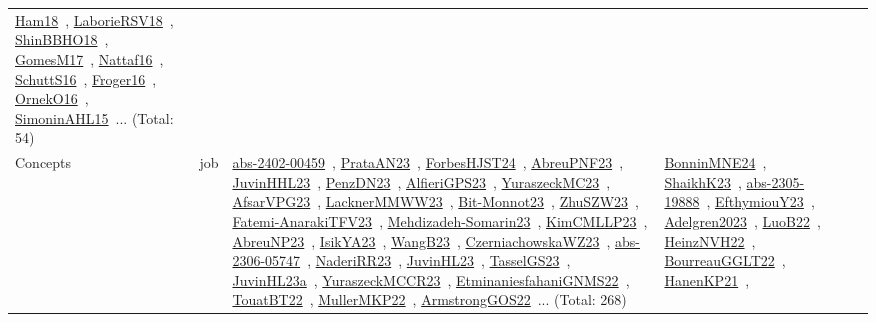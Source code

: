 {\begin{longtable}{lp{3cm}>{\raggedright\arraybackslash}p{6cm}>{\raggedright\arraybackslash}p{6cm}>{\raggedright\arraybackslash}p{8cm}}
\href{../works/Ham18.pdf}{Ham18}~\cite{Ham18}, \href{../works/LaborieRSV18.pdf}{LaborieRSV18}~\cite{LaborieRSV18}, \href{../works/ShinBBHO18.pdf}{ShinBBHO18}~\cite{ShinBBHO18}, \href{../works/GomesM17.pdf}{GomesM17}~\cite{GomesM17}, \href{../works/Nattaf16.pdf}{Nattaf16}~\cite{Nattaf16}, \href{../works/SchuttS16.pdf}{SchuttS16}~\cite{SchuttS16}, \href{../works/Froger16.pdf}{Froger16}~\cite{Froger16}, \href{../works/OrnekO16.pdf}{OrnekO16}~\cite{OrnekO16}, \href{../works/SimoninAHL15.pdf}{SimoninAHL15}~\cite{SimoninAHL15}... (Total: 54)\\
Concepts & job & \href{../works/abs-2402-00459.pdf}{abs-2402-00459}~\cite{abs-2402-00459}, \href{../works/PrataAN23.pdf}{PrataAN23}~\cite{PrataAN23}, \href{../works/ForbesHJST24.pdf}{ForbesHJST24}~\cite{ForbesHJST24}, \href{../works/AbreuPNF23.pdf}{AbreuPNF23}~\cite{AbreuPNF23}, \href{../works/JuvinHHL23.pdf}{JuvinHHL23}~\cite{JuvinHHL23}, \href{../works/PenzDN23.pdf}{PenzDN23}~\cite{PenzDN23}, \href{../works/AlfieriGPS23.pdf}{AlfieriGPS23}~\cite{AlfieriGPS23}, \href{../works/YuraszeckMC23.pdf}{YuraszeckMC23}~\cite{YuraszeckMC23}, \href{../works/AfsarVPG23.pdf}{AfsarVPG23}~\cite{AfsarVPG23}, \href{../works/LacknerMMWW23.pdf}{LacknerMMWW23}~\cite{LacknerMMWW23}, \href{../works/Bit-Monnot23.pdf}{Bit-Monnot23}~\cite{Bit-Monnot23}, \href{../works/ZhuSZW23.pdf}{ZhuSZW23}~\cite{ZhuSZW23}, \href{../works/Fatemi-AnarakiTFV23.pdf}{Fatemi-AnarakiTFV23}~\cite{Fatemi-AnarakiTFV23}, \href{../works/Mehdizadeh-Somarin23.pdf}{Mehdizadeh-Somarin23}~\cite{Mehdizadeh-Somarin23}, \href{../works/KimCMLLP23.pdf}{KimCMLLP23}~\cite{KimCMLLP23}, \href{../works/AbreuNP23.pdf}{AbreuNP23}~\cite{AbreuNP23}, \href{../works/IsikYA23.pdf}{IsikYA23}~\cite{IsikYA23}, \href{../works/WangB23.pdf}{WangB23}~\cite{WangB23}, \href{../works/CzerniachowskaWZ23.pdf}{CzerniachowskaWZ23}~\cite{CzerniachowskaWZ23}, \href{../works/abs-2306-05747.pdf}{abs-2306-05747}~\cite{abs-2306-05747}, \href{../works/NaderiRR23.pdf}{NaderiRR23}~\cite{NaderiRR23}, \href{../works/JuvinHL23.pdf}{JuvinHL23}~\cite{JuvinHL23}, \href{../works/TasselGS23.pdf}{TasselGS23}~\cite{TasselGS23}, \href{../works/JuvinHL23a.pdf}{JuvinHL23a}~\cite{JuvinHL23a}, \href{../works/YuraszeckMCCR23.pdf}{YuraszeckMCCR23}~\cite{YuraszeckMCCR23}, \href{../works/EtminaniesfahaniGNMS22.pdf}{EtminaniesfahaniGNMS22}~\cite{EtminaniesfahaniGNMS22}, \href{../works/TouatBT22.pdf}{TouatBT22}~\cite{TouatBT22}, \href{../works/MullerMKP22.pdf}{MullerMKP22}~\cite{MullerMKP22}, \href{../works/ArmstrongGOS22.pdf}{ArmstrongGOS22}~\cite{ArmstrongGOS22}... (Total: 268) & \href{../works/BonninMNE24.pdf}{BonninMNE24}~\cite{BonninMNE24}, \href{../works/ShaikhK23.pdf}{ShaikhK23}~\cite{ShaikhK23}, \href{../works/abs-2305-19888.pdf}{abs-2305-19888}~\cite{abs-2305-19888}, \href{../works/EfthymiouY23.pdf}{EfthymiouY23}~\cite{EfthymiouY23}, \href{../works/Adelgren2023.pdf}{Adelgren2023}~\cite{Adelgren2023}, \href{../works/LuoB22.pdf}{LuoB22}~\cite{LuoB22}, \href{../works/HeinzNVH22.pdf}{HeinzNVH22}~\cite{HeinzNVH22}, \href{../works/BourreauGGLT22.pdf}{BourreauGGLT22}~\cite{BourreauGGLT22}, \href{../works/HanenKP21.pdf}{HanenKP21}~\cite{HanenKP21}, 
\end{longtable}}
